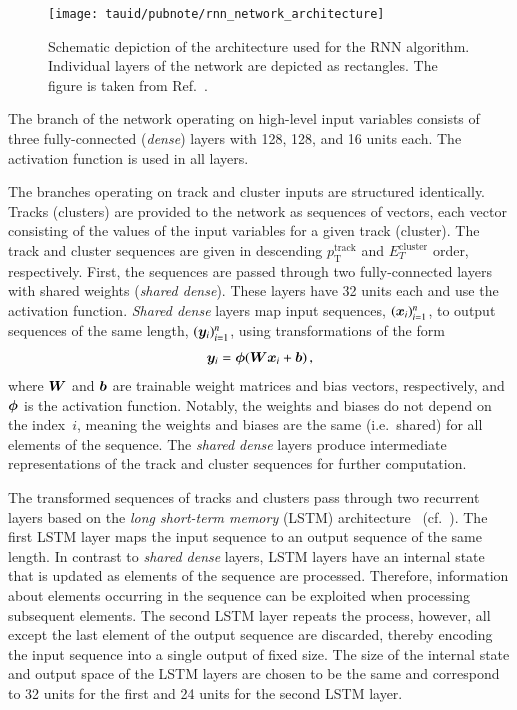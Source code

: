 \begin{figure}[htbp]
  \centering

  \texttt{[image: tauid/pubnote/rnn\_network\_architecture]}

  \caption{Schematic depiction of the architecture used for the RNN
    \tauid algorithm. Individual layers of the network are depicted as
    rectangles. The figure is taken from
    Ref.~\cite{ATL-PHYS-PUB-2019-033}.}%
  \label{fig:tauid_network_architecture}
\end{figure}

The branch of the network operating on high-level input variables
consists of three fully-connected (\emph{dense}) layers with 128, 128,
and 16 units each. The \ReLU~\cite{nair:relu} activation function is
used in all layers.

The branches operating on track and cluster inputs are structured
identically. Tracks (clusters) are provided to the network as
sequences of vectors, each vector consisting of the values of the
input variables for a given track (cluster). The track and cluster
sequences are given in descending $p_{\text{T}}^{\text{track}}$ and
$E_{T}^{\text{cluster}}$ order, respectively. First, the sequences are
passed through two fully-connected layers with shared weights
(\emph{shared dense}).  These layers have 32 units each and use the
\ReLU activation function. \emph{Shared dense} layers map input
sequences, $(\bm{x}_i)_{i=1}^{n}$, to output sequences of the same
length, $(\bm{y}_i)_{i=1}^{n}$, using transformations of the form
\begin{align*}
  \bm{y}_i = \bm{\phi}(\bm{W} \bm{x}_i + \bm{b}) \,\text{,}
\end{align*}
where $\bm{W}$ and $\bm{b}$ are trainable weight matrices and
bias vectors, respectively, and $\bm{\phi}$ is the activation
function.  Notably, the weights and biases do not depend on the
index~$i$, meaning the weights and biases are the same (i.e.\ shared)
for all elements of the sequence. The \emph{shared dense} layers
produce intermediate representations of the track and cluster
sequences for further computation.

The transformed sequences of tracks and clusters pass through two
recurrent layers based on the \emph{long short-term memory} (LSTM)
architecture~\cite{lstm} (cf.\ ). The first LSTM layer
maps the input sequence to an output sequence of the same length. In
contrast to \emph{shared dense} layers, LSTM layers have an internal
state that is updated as elements of the sequence are
processed. Therefore, information about elements occurring in the
sequence can be exploited when processing subsequent elements. The
second LSTM layer repeats the process, however, all except the last
element of the output sequence are discarded, thereby encoding the
input sequence into a single output of fixed size. The size of the
internal state and output space of the LSTM layers are chosen to be
the same and correspond to 32 units for the first and 24 units for the
second LSTM layer.

